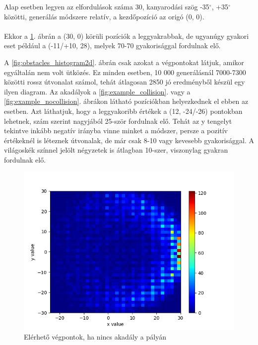 Alap esetben legyen az elfordulások száma 30, kanyarodási szög -35$^{\circ}$, +35$^{\circ}$ közötti, generálás módszere relatív, a kezdőpozíció az origó (0, 0).\\\\
Ekkor a \ref{fig:no_obstacles_histogram2d}. ábrán a (30, 0) körüli pozíciók a leggyakrabbak, de ugyanúgy gyakori eset például a (-11/+10, 28), melyek 70-70 gyakorisággal fordulnak elő.

A \ref{fig:obstacles_histogram2d}. ábrán csak azokat a végpontokat látjuk, amikor egyáltalán nem volt ütközés. Ez minden esetben, 10 000 generálásnál 7000-7300 közötti rossz útvonalat számol, tehát átlagosan 2850 jó eredményből készül egy ilyen diagram. Az akadályok a \ref{fig:example_collision}. vagy a \ref{fig:example_nocollision}. ábrákon látható pozíciókban helyezkednek el ebben az esetben. Azt láthatjuk, hogy a leggyakoribb értékek a (12, -24/-26) pontokban lehetnek, szám szerint nagyjából 25-ször fordulnak elő. Tehát az y tengelyt tekintve inkább negatív irányba vinne minket a módszer, persze a pozitív értékeknél is léteznek útvonalak, de már csak 8-10 vagy kevesebb gyakorisággal. A világoskék színnel jelölt négyzetek is átlagban 10-szer, viszonylag gyakran fordulnak elő.

\begin{figure}[h!]
\centering
\includegraphics[scale=0.75]{images/no_obstacles_histogram2d.png}
\caption{Elérhető végpontok, ha nincs akadály a pályán}
\label{fig:no_obstacles_histogram2d}
\end{figure}

